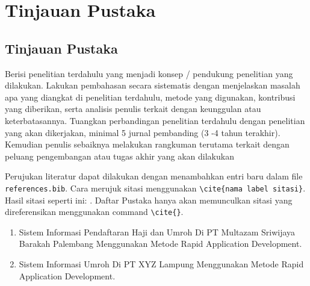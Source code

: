 \newpage
\chapter{Tinjauan Pustaka} \label{Bab II}

\section{Tinjauan Pustaka} \label{II.Tinjauan}
Berisi penelitian terdahulu yang menjadi konsep / pendukung penelitian yang dilakukan. Lakukan pembahasan secara sistematis dengan menjelaskan masalah apa yang diangkat di penelitian terdahulu, metode yang digunakan, kontribusi yang diberikan, serta analisis penulis terkait dengan keunggulan atau keterbatasannya. Tuangkan perbandingan penelitian terdahulu dengan penelitian yang akan dikerjakan, minimal 5 jurnal pembanding (3 -4 tahun terakhir). Kemudian penulis sebaiknya melakukan rangkuman terutama terkait dengan peluang pengembangan atau tugas akhir yang akan dilakukan \par

Perujukan literatur dapat dilakukan dengan menambahkan entri baru dalam file \verb|references.bib|. Cara merujuk sitasi menggunakan \verb|\cite{nama label sitasi}|. Hasil sitasi seperti ini: \cite{knuth2001art}. Daftar Pustaka hanya akan memunculkan sitasi yang direferensikan menggunakan command \verb|\cite{}|. \par

\begin{enumerate}[noitemsep]
	\item Sistem Informasi Pendaftaran Haji dan Umroh Di PT Multazam Sriwijaya Barakah Palembang Menggunakan Metode Rapid Application Development. \blindtext
	\item Sistem Informasi Umroh Di PT XYZ Lampung Menggunakan Metode Rapid Application Development. \blindtext
\end{enumerate}

